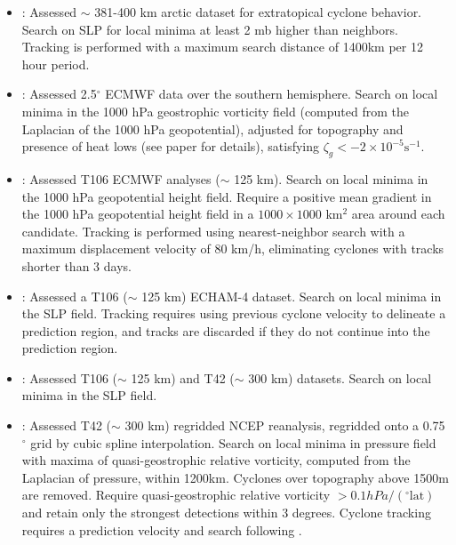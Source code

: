 \documentclass[gmdd, hvmath, online]{copernicus_discussions}
\begin{document}
\begin{itemize}
\item \cite{serreze1993characteristics, serreze1995climatological}:  Assessed $\sim$ 381-400 km arctic dataset for extratopical cyclone behavior.  Search on SLP for local minima at least 2 mb higher than neighbors.  Tracking is performed with a maximum search distance of 1400km per 12 hour period.

\item \cite{sinclair1994objective, sinclair1997objective}:  Assessed 2.5$^\circ$ ECMWF data over the southern hemisphere.  Search on local minima in the 1000 hPa geostrophic vorticity field (computed from the Laplacian of the 1000 hPa geopotential), adjusted for topography and presence of heat lows (see paper for details), satisfying $\zeta_g < -2 \times 10^{-5} \mbox{s}^{-1}$.

\item \cite{blender1997identification}:  Assessed T106 ECMWF analyses ($\sim$ 125 km).  Search on local minima in the 1000 hPa geopotential height field.  Require a positive mean gradient in the 1000 hPa geopotential height field in a $1000 \times 1000$ km$^2$ area around each candidate.  Tracking is performed using nearest-neighbor search with a maximum displacement velocity of 80 km/h, eliminating cyclones with tracks shorter than 3 days.

\item \cite{lionello2002cyclones}:  Assessed a T106 ($\sim$ 125 km) ECHAM-4 dataset.  Search on local minima in the SLP field.  Tracking requires using previous cyclone velocity to delineate a prediction region, and tracks are discarded if they do not continue into the prediction region.

\item \cite{zolina2002improving}:  Assessed T106 ($\sim$ 125 km) and T42 ($\sim$ 300 km) datasets.  Search on local minima in the SLP field.

\item \cite{pinto2005sensitivities}:  Assessed T42 ($\sim$ 300 km) regridded NCEP reanalysis, regridded onto a 0.75$^\circ$ grid by cubic spline interpolation.  Search on local minima in pressure field with maxima of quasi-geostrophic relative vorticity, computed from the Laplacian of pressure, within 1200km.  Cyclones over topography above 1500m are removed.  Require quasi-geostrophic relative vorticity $> 0.1 hPa / (^\circ \mbox{lat})$ and retain only the strongest detections within 3 degrees.  Cyclone tracking requires a prediction velocity and search following \cite{murray1991numerical}.


\end{itemize}
\end{document}
